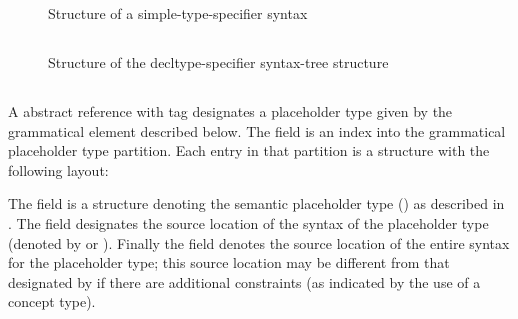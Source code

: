 \begin{figure}[H]
	\centering
	\caption{Structure of a simple-type-specifier syntax}
	\label{fig:ifc:SyntaxSort:SimpleTypeSpecifier}
\end{figure}


\subsection{}
\label{sec:ifc:SyntaxSort:DecltypeSpecifier}

\begin{figure}[H]
	\centering
	\caption{Structure of the decltype-specifier syntax-tree structure}
	\label{fig:ifc:SyntaxSort:DecltypeSpecifier}
\end{figure}


\subsection{}
\label{sec:ifc:SyntaxSort:PlaceholderTypeSpecifier}

A  abstract reference with tag 
designates a placeholder type given by the grammatical element described below.
The  field is an index into the grammatical placeholder type 
partition.  Each entry in that partition is a structure with the following
layout:
%
\begin{figure}[H]
	\centering
	\label{fig:ifc:SyntaxSort:PlaceholderTypeSpecifier}
\end{figure}
%
The  field is a structure denoting the semantic placeholder type
 () as described in .  The  field
designates the source location of the syntax of the placeholder type
(denoted by  or ).  Finally the  field
denotes the source location of the entire syntax for the placeholder type;
this source location may be different from that designated by 
if there are additional constraints (as indicated by the use of a concept type).

